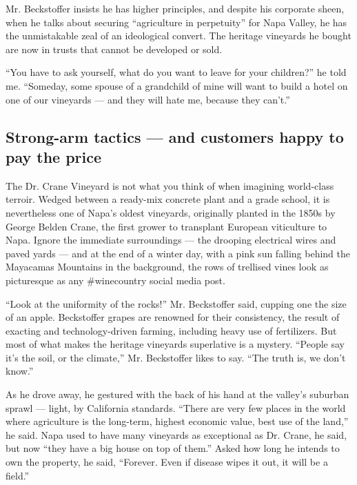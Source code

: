 Mr. Beckstoffer insists he has higher principles, and despite his
corporate sheen, when he talks about securing ``agriculture in
perpetuity'' for Napa Valley, he has the unmistakable zeal of an
ideological convert. The heritage vineyards he bought are now in trusts
that cannot be developed or sold.

``You have to ask yourself, what do you want to leave for your
children?'' he told me. ``Someday, some spouse of a grandchild of mine
will want to build a hotel on one of our vineyards --- and they will
hate me, because they can't.''

\hypertarget{strong-arm-tactics--and-customers-happy-to-pay-the-price}{%
\subsection{Strong-arm tactics --- and customers happy to pay the
price}\label{strong-arm-tactics--and-customers-happy-to-pay-the-price}}

The Dr. Crane Vineyard is not what you think of when imagining
world-class terroir. Wedged between a ready-mix concrete plant and a
grade school, it is nevertheless one of Napa's oldest vineyards,
originally planted in the 1850s by George Belden Crane, the first grower
to transplant European viticulture to Napa. Ignore the immediate
surroundings --- the drooping electrical wires and paved yards --- and
at the end of a winter day, with a pink sun falling behind the Mayacamas
Mountains in the background, the rows of trellised vines look as
picturesque as any \#winecountry social media post.

``Look at the uniformity of the rocks!'' Mr. Beckstoffer said, cupping
one the size of an apple. Beckstoffer grapes are renowned for their
consistency, the result of exacting and technology-driven farming,
including heavy use of fertilizers. But most of what makes the heritage
vineyards superlative is a mystery. ``People say it's the soil, or the
climate,'' Mr. Beckstoffer likes to say. ``The truth is, we don't
know.''

As he drove away, he gestured with the back of his hand at the valley's
suburban sprawl --- light, by California standards. ``There are very few
places in the world where agriculture is the long-term, highest economic
value, best use of the land,'' he said. Napa used to have many vineyards
as exceptional as Dr. Crane, he said, but now ``they have a big house on
top of them.'' Asked how long he intends to own the property, he said,
``Forever. Even if disease wipes it out, it will be a field.''

